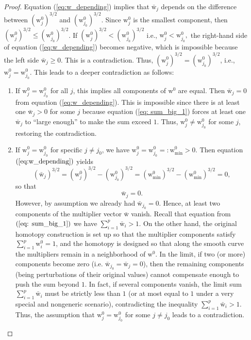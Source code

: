\documentclass[11pt,pdflatex,sn-mathphys-ay]{sn-jnl}%
\theoremstyle{definition}
\theoremstyle{thmstyleone}%
\theoremstyle{thmstyletwo}%
\theoremstyle{thmstylethree}%
\begin{document}
\begin{proof}
		\noindent Equation (\ref{eq:w_depending}) implies that $\bar {\text{w}}_j$ 
		depends on the difference between $(\text{w}_j^0)^{3/2}$ and $(\text{w}_{j_0}^0)^{3/2}$. Since $\text{w}_j^0$ is the smallest component, then $(\text{w}_j^0)^{3/2} \leq (\text{w}_{j_0}^0)^{3/2}$. 
		If $(\text{w}_j^0)^{3/2} < (\text{w}_{j_0}^0)^{3/2}$ i.e., $\text{w}_j^0 < \text{w}_{j_0}^0,$ the right-hand side of equation (\ref{eq:w_depending}) becomes negative, which is impossible because the left side $\bar{\text{w}}_j \geq 0$. This is a contradiction. Thus, $(\text{w}_j^0)^{3/2} = (\text{w}_{j_0}^0)^{3/2}$, i.e., $\text{w}_j^0 = \text{w}_{j_0}^0$. This leads to a deeper contradiction as follows:
		\begin{enumerate}
			\item If $\text{w}_j^0 = \text{w}_{j_0}^0$ for all $j$, this implies all components of $\text{w}^0$ are equal. Then $\bar{\text{w}}_j = 0$ from  equation (\ref{eq:w_depending}). This is impossible since there is at least one $\bar{\text{w}}_j > 0$ for some $j$ because equation (\ref{eq: sum_big_1}) forces at least one $\bar{\text{w}}_j$ to ``large enough'' to make the sum exceed $1$. Thus, $\text{w}_j^0 \neq \text{w}_{j_0}^0$ for some $j$, restoring the contradiction.
			
			\item If $\text{w}_j^0 = \text{w}_{j_0}^0$ for specific $j\neq j_0$, we have $\text{w}_j^0 = \text{w}_{j_0}^0 =: \text{w}_{\min}^0 > 0.$
			Then equation \((\ref{eq:w_depending})\) yields
			\[
			(\bar{\text{w}}_j)^{3/2} = (\text{w}_j^0)^{3/2} - (\text{w}_{j_0}^0)^{3/2} = (\text{w}_{\min}^0)^{3/2} - (\text{w}_{\min}^0)^{3/2} = 0,
			\]
			so that
			\[
			\bar{\text{w}}_j = 0.
			\]
			\noindent However, by assumption we already had \(\bar{\text{w}}_{j_0}=0\). Hence, at least two components of the multiplier vector \(\bar{\text{w}}\) vanish. Recall that equation from \((\ref{eq: sum_big_1})\) we have $\sum_{i=1}^p \bar{\text{w}}_i > 1.$
			On the other hand, the original homotopy construction is set up 
			so that the multiplier components satisfy
			$\sum_{i=1}^p \text{w}_i^0 = 1$,
			and the homotopy is designed so that along the smooth curve the multipliers remain in a neighborhood of \(\text{w}^0\). In the limit, if two (or more) components become zero (i.e. \(\bar{\text{w}}_{j_0} = \bar{\text{w}}_j = 0\)), then the remaining components (being perturbations of their original values) cannot compensate enough to push the sum beyond \(1\). In fact, if several components vanish, the limit sum \(\sum_{i=1}^p \bar{\text{w}}_i\) must be strictly less than \(1\) (or at most equal to \(1\) under a very special and nongeneric scenario), contradicting the inequality $\sum_{i=1}^p \bar{\text{w}}_i > 1.$
			Thus, the assumption that \(\text{w}_j^0 = \text{w}_{j_0}^0\) for some \(j\neq j_0\) leads to a contradiction.
		\end{enumerate} 
		

\end{proof}
\end{document}
